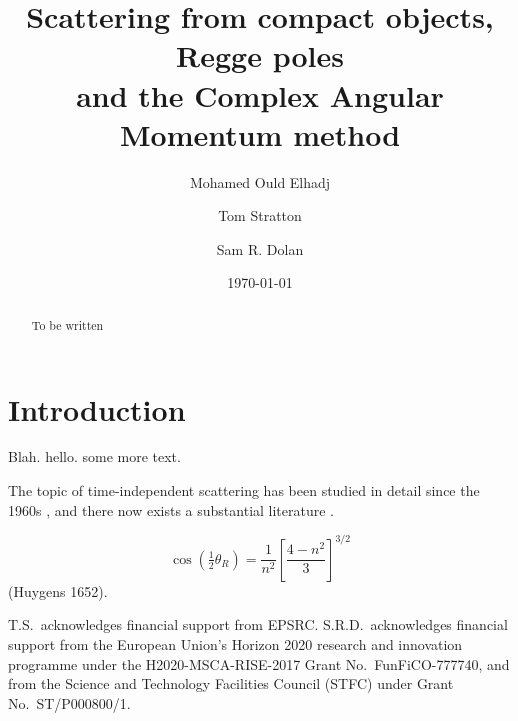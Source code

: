 \documentclass[preprint,showpacs,preprintnumbers,amssymb,superscriptaddress,aps,prd,nofootinbib,11pt]{revtex4-1}
\newcommand{\be}{\begin{equation}}
\newcommand{\ee}{\end{equation}}
\begin{document}
\title{Scattering from compact objects, Regge poles \\ and the Complex Angular Momentum method}
 
\author{Mohamed Ould Elhadj}
%
\author{Tom Stratton}
%
\author{Sam R. Dolan}
% 
\begin{abstract}
To be written
\end{abstract}

\date{\today}

\maketitle


\section{Introduction}
Blah. hello. some more text.

 The topic of time-independent scattering has been studied in detail since the 1960s \cite{Hildreth1964PhDT64, Matzner:1968, Vishveshwara:1970}, and there now exists a substantial literature \cite{Mashhoon:1973zz,Chrzanowski:1976jb,DeLogi:1977dp,Sanchez:1977vz,MatznerRyan1978,Handler:1980un,Matzner:1985rjn,Futterman:1988ni,Andersson:1995vi,Glampedakis:2001cx,Dolan:2006vj,Dolan:2007ut,Dolan:2008kf,Crispino:2009xt,Cotaescu:2014jca,Sorge:2015yoa,Gussmann:2016mkp,Leite:2017zyb,Nambu:2019sqn, Folacci:2019vtt,Leite:2019eis}. 


\be
\cos \left( \tfrac{1}{2} \theta_R \right) = \frac{1}{n^2} \left[ \frac{4 - n^2}{3} \right]^{3/2}
\ee
(Huygens 1652). 


\acknowledgments
T.S.~acknowledges financial support from EPSRC. S.R.D.~acknowledges financial support from the European Union's Horizon 2020 research and innovation programme under the H2020-MSCA-RISE-2017 Grant No.~FunFiCO-777740, and from the Science and Technology Facilities Council (STFC) under Grant No.~ST/P000800/1.




\end{document}
